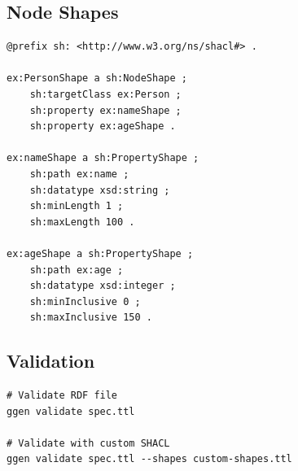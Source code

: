 \subsection{Node Shapes}

\begin{verbatim}
@prefix sh: <http://www.w3.org/ns/shacl#> .

ex:PersonShape a sh:NodeShape ;
    sh:targetClass ex:Person ;
    sh:property ex:nameShape ;
    sh:property ex:ageShape .

ex:nameShape a sh:PropertyShape ;
    sh:path ex:name ;
    sh:datatype xsd:string ;
    sh:minLength 1 ;
    sh:maxLength 100 .

ex:ageShape a sh:PropertyShape ;
    sh:path ex:age ;
    sh:datatype xsd:integer ;
    sh:minInclusive 0 ;
    sh:maxInclusive 150 .
\end{verbatim}

\subsection{Validation}

\begin{verbatim}
# Validate RDF file
ggen validate spec.ttl

# Validate with custom SHACL
ggen validate spec.ttl --shapes custom-shapes.ttl
\end{verbatim}
